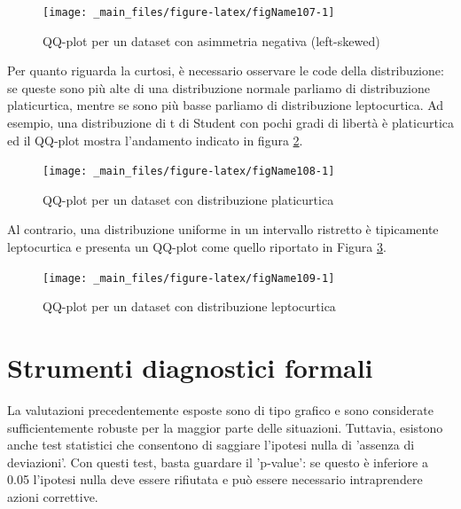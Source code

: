 \documentclass[a4paper,12pt,oneside]{book}
\begin{document}
\begin{figure}

{\centering \texttt{[image: \_main\_files/figure-latex/figName107-1]} 

}

\caption{QQ-plot per un dataset con asimmetria negativa (left-skewed)}\label{fig:figName107}
\end{figure}

Per quanto riguarda la curtosi, è necessario osservare le code della distribuzione: se queste sono più alte di una distribuzione normale parliamo di distribuzione platicurtica, mentre se sono più basse parliamo di distribuzione leptocurtica. Ad esempio, una distribuzione di t di Student con pochi gradi di libertà è platicurtica ed il QQ-plot mostra l'andamento indicato in figura \ref{fig:figName108}.

\begin{figure}

{\centering \texttt{[image: \_main\_files/figure-latex/figName108-1]} 

}

\caption{QQ-plot per un dataset con distribuzione platicurtica}\label{fig:figName108}
\end{figure}

Al contrario, una distribuzione uniforme in un intervallo ristretto è tipicamente leptocurtica e presenta un QQ-plot come quello riportato in Figura \ref{fig:figName109}.

\begin{figure}

{\centering \texttt{[image: \_main\_files/figure-latex/figName109-1]} 

}

\caption{QQ-plot per un dataset con distribuzione leptocurtica}\label{fig:figName109}
\end{figure}

\hypertarget{strumenti-diagnostici-formali}{%
\section{Strumenti diagnostici formali}\label{strumenti-diagnostici-formali}}

La valutazioni precedentemente esposte sono di tipo grafico e sono considerate sufficientemente robuste per la maggior parte delle situazioni. Tuttavia, esistono anche test statistici che consentono di saggiare l'ipotesi nulla di 'assenza di deviazioni'. Con questi test, basta guardare il 'p-value': se questo è inferiore a 0.05 l'ipotesi nulla deve essere rifiutata e può essere necessario intraprendere azioni correttive.
\end{document}
